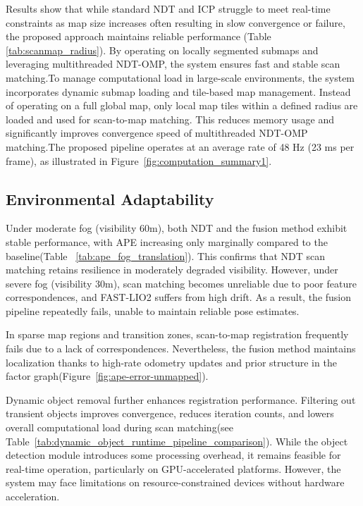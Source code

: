 Results show that while standard NDT and ICP struggle to meet real-time constraints as map size  increases often resulting in slow convergence or failure, the proposed approach maintains reliable performance (Table \ref{tab:scanmap_radius}). By operating on locally segmented submaps and leveraging multithreaded NDT-OMP, the system ensures fast and stable scan matching.To manage computational load in large-scale environments, the system incorporates dynamic submap loading and tile-based map management. Instead of operating on a full global map, only local map tiles within a defined radius are loaded and used for scan-to-map matching. This reduces memory usage and significantly improves convergence speed of multithreaded NDT-OMP matching.The proposed pipeline operates at an average rate of 48 Hz (23 ms per frame), as illustrated in Figure~\ref{fig:computation_summary1}.

\subsection{Environmental Adaptability }
Under moderate fog (visibility {60}{m}), both NDT and the fusion method exhibit stable performance, with {APE} increasing only marginally compared to the baseline(Table ~\ref{tab:ape_fog_translation}). This confirms that {NDT} scan matching retains resilience in moderately degraded visibility. However, under severe fog ({visibility 30}{m}), scan matching becomes unreliable due to poor feature correspondences, and {FAST-LIO2} suffers from high drift. As a result, the fusion pipeline repeatedly fails, unable to maintain reliable pose estimates. 

In sparse map regions and transition zones, scan-to-map registration frequently fails due to a lack of correspondences. Nevertheless, the fusion method maintains localization thanks to high-rate odometry updates and prior structure in the factor graph(Figure~\ref{fig:ape-error-unmapped}).

Dynamic object removal further enhances registration performance. Filtering out transient objects improves convergence, reduces iteration counts, and lowers overall computational load during scan matching(see Table~\ref{tab:dynamic_object_runtime_pipeline_comparison}). While the object detection module introduces some processing overhead, it remains feasible for real-time operation, particularly on GPU-accelerated platforms. However, the system may face limitations on resource-constrained devices without hardware acceleration.

